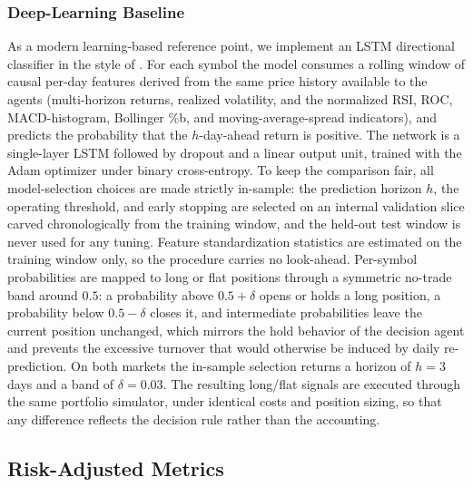 \documentclass{ieeeaccess}
\newcommand{\LSTMhorizon}{\ensuremath{3}}
\newcommand{\LSTMband}{\ensuremath{0.03}}
\begin{document}
\subsubsection{Deep-Learning Baseline}
\label{subsec:lstm}
As a modern learning-based reference point, we implement an LSTM directional classifier in the style of \cite{fischerkrauss2018}. For each symbol the model consumes a rolling window of causal per-day features derived from the same price history available to the agents (multi-horizon returns, realized volatility, and the normalized RSI, ROC, MACD-histogram, Bollinger \%b, and moving-average-spread indicators), and predicts the probability that the $h$-day-ahead return is positive. The network is a single-layer LSTM followed by dropout and a linear output unit, trained with the Adam optimizer under binary cross-entropy. To keep the comparison fair, all model-selection choices are made strictly in-sample: the prediction horizon $h$, the operating threshold, and early stopping are selected on an internal validation slice carved chronologically from the training window, and the held-out test window is never used for any tuning. Feature standardization statistics are estimated on the training window only, so the procedure carries no look-ahead. Per-symbol probabilities are mapped to long or flat positions through a symmetric no-trade band around $0.5$: a probability above $0.5 + \delta$ opens or holds a long position, a probability below $0.5 - \delta$ closes it, and intermediate probabilities leave the current position unchanged, which mirrors the hold behavior of the decision agent and prevents the excessive turnover that would otherwise be induced by daily re-prediction. On both markets the in-sample selection returns a horizon of $h = \LSTMhorizon$ days and a band of $\delta = \LSTMband$. The resulting long/flat signals are executed through the same portfolio simulator, under identical costs and position sizing, so that any difference reflects the decision rule rather than the accounting.

\subsection{Risk-Adjusted Metrics}
\label{subsec:metrics}
\end{document}
